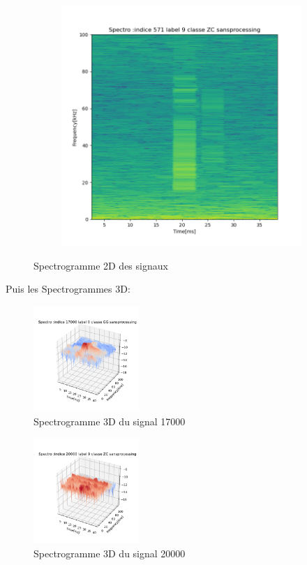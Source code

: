 \begin{figure}[!h]
\begin{subfigure}[b]{0.3\textwidth}
  \end{subfigure}
  \begin{subfigure}[b]{0.3\textwidth}
    \includegraphics[width=\textwidth]{./images/indice571Spectro2Dlabel9classeZCsansprocessingsanszoom.png}
  \end{subfigure}
  \caption{Spectrogramme 2D des signaux}
\end{figure}

Puis les Spectrogrammes 3D:

\begin{figure}[!h]
\centering
\includegraphics[width=4cm]{./images/indice17000Spectro3Dlabel0classeGGsansprocessingsanszoom.png}
\caption{Spectrogramme 3D du signal 17000}
\end{figure}
\begin{figure}[!h]
\centering
\includegraphics[width=4cm]{./images/indice20000Spectro3Dlabel9classeZCsansprocessingsanszoom.png}
\caption{Spectrogramme 3D du signal 20000}
\end{figure}

